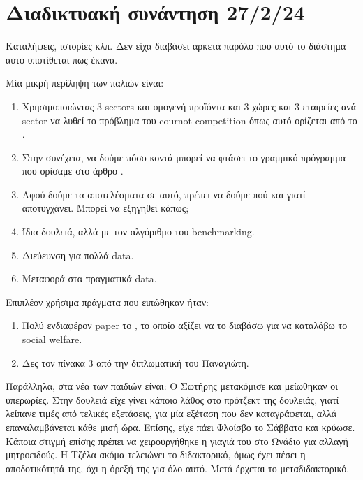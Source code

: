 \documentclass[a4paper,twoside,10pt]{article}
\begin{document}
\section{Διαδικτυακή συνάντηση 27/2/24}
Καταλήψεις, ιστορίες κλπ. Δεν είχα διαβάσει αρκετά παρόλο που αυτό το διάστημα αυτό υποτίθεται πως έκανα. 

Μία μικρή περίληψη των παλιών είναι: 
\begin{enumerate}
	\item Χρησιμοποιώντας 3 sectors και ομογενή προϊόντα και 3 χώρες και 3 εταιρείες ανά sector να λυθεί το πρόβλημα του cournot competition όπως αυτό ορίζεται από το \cite{Allocating}.
	\item Στην συνέχεια, να δούμε πόσο κοντά μπορεί να φτάσει το γραμμικό πρόγραμμα που ορίσαμε στο άρθρο \cite{First}. 
	\item Αφού δούμε τα αποτελέσματα σε αυτό, πρέπει να δούμε πού και γιατί αποτυγχάνει. Μπορεί να εξηγηθεί κάπως;
	\item Ίδια δουλειά, αλλά με τον αλγόριθμο του benchmarking. 
	\item Διεύευνση για πολλά data.
	\item Μεταφορά στα πραγματικά data. 
\end{enumerate}
Επιπλέον χρήσιμα πράγματα που ειπώθηκαν ήταν:
\begin{enumerate}
	\item Πολύ ενδιαφέρον paper το \cite{'2269'}, το οποίο αξίζει να το διαβάσω για να καταλάβω το social welfare. 
	\item Δες τον πίνακα 3 από την διπλωματική του Παναγιώτη.
\end{enumerate}
Παράλληλα, στα νέα των παιδιών είναι: Ο Σωτήρης μετακόμισε και μείωθηκαν οι υπερωρίες. Στην δουλειά είχε γίνει κάποιο λάθος στο πρότζεκτ της δουλειάς, γιατί λείπανε τιμές από τελικές εξετάσεις, για μία εξέταση που δεν καταγράφεται, αλλά επαναλαμβάνεται κάθε μισή ώρα. Επίσης, είχε πάει Φλοίσβο το Σάββατο και κρύωσε. Κάποια στιγμή επίσης πρέπει να χειρουργήθηκε η γιαγιά του στο Ωνάδιο για αλλαγή μητροειδούς. 
Η Τζέλα ακόμα τελειώνει το διδακτορικό, όμως έχει πέσει η αποδοτικότητά της, όχι η όρεξή της για όλο αυτό. Μετά έρχεται το μεταδιδακτορικό. 
\end{document}
